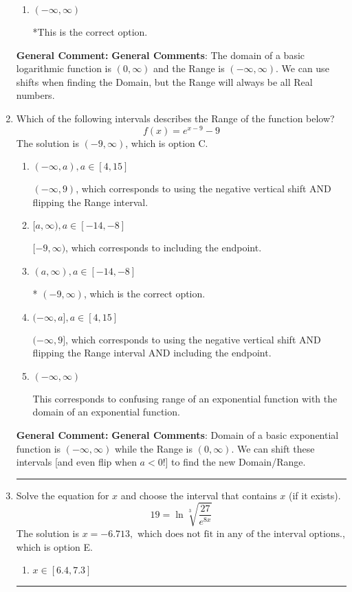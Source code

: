 \documentclass{extbook}[14pt]
\newcommand{\litem}[1]{\item #1

\rule{\textwidth}{0.4pt}}
\begin{document}
\begin{enumerate}
{\begin{enumerate}[label=\Alph*.]
$(-\infty, 9)$, which corresponds to using the using the negative of vertical shift on $(0, \infty)$.
\item \( (-\infty, \infty) \)

*This is the correct option.
\end{enumerate}

\textbf{General Comment:} \textbf{General Comments}: The domain of a basic logarithmic function is $(0, \infty)$ and the Range is $(-\infty, \infty)$. We can use shifts when finding the Domain, but the Range will always be all Real numbers.
}
\litem{
Which of the following intervals describes the Range of the function below?
\[ f(x) = e^{x-9}-9 \]The solution is \( (-9, \infty) \), which is option C.\begin{enumerate}[label=\Alph*.]
\item \( (-\infty, a), a \in [4, 15] \)

$(-\infty, 9)$, which corresponds to using the negative vertical shift AND flipping the Range interval.
\item \( [a, \infty), a \in [-14, -8] \)

$[-9, \infty)$, which corresponds to including the endpoint.
\item \( (a, \infty), a \in [-14, -8] \)

* $(-9, \infty)$, which is the correct option.
\item \( (-\infty, a], a \in [4, 15] \)

$(-\infty, 9]$, which corresponds to using the negative vertical shift AND flipping the Range interval AND including the endpoint.
\item \( (-\infty, \infty) \)

This corresponds to confusing range of an exponential function with the domain of an exponential function.
\end{enumerate}

\textbf{General Comment:} \textbf{General Comments}: Domain of a basic exponential function is $(-\infty, \infty)$ while the Range is $(0, \infty)$. We can shift these intervals [and even flip when $a<0$!] to find the new Domain/Range.
}
\litem{
 Solve the equation for $x$ and choose the interval that contains $x$ (if it exists).
\[  19 = \ln{\sqrt[3]{\frac{27}{e^{8x}}}} \]The solution is \( x = -6.713, \text{ which does not fit in any of the interval options.} \), which is option E.\begin{enumerate}[label=\Alph*.]
\item \( x \in [6.4, 7.3] \)


\end{enumerate}}
\end{enumerate}
\end{document}
